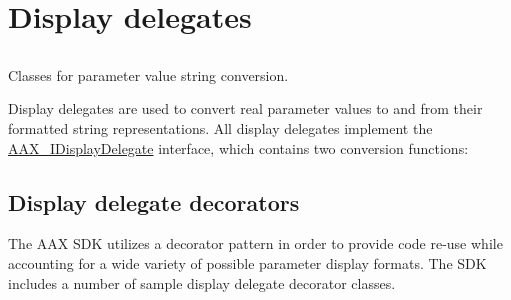 \hypertarget{a00816}{}\section{Display delegates}
\label{a00816}


\subsection{ }
Classes for parameter value string conversion. 

Display delegates are used to convert real parameter values to and from their formatted string representations. All display delegates implement the \mbox{\hyperlink{a01801}{A\+A\+X\+\_\+\+I\+Display\+Delegate}} interface, which contains two conversion functions\+:


\begin{DoxyCode}{0}
\end{DoxyCode}
\hypertarget{a00816_displaydelegates_decorators}{}\subsection{Display delegate decorators}\label{a00816_displaydelegates_decorators}
The A\+AX S\+DK utilizes a decorator pattern in order to provide code re-\/use while accounting for a wide variety of possible parameter display formats. The S\+DK includes a number of sample display delegate decorator classes.

